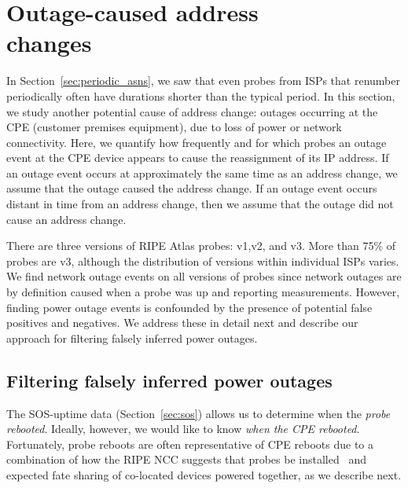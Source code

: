 
\section{Outage-caused address \\ changes}
\label{sec:outages}

In Section~\ref{sec:periodic_asns}, we saw that even probes from ISPs
that renumber periodically
often have durations shorter than the typical period. In this section,
we study another potential cause of address change: outages occurring
at the CPE (customer premises equipment), due to loss of power or network connectivity. Here, we quantify how frequently and for which probes an
outage event at the CPE device appears to
cause the reassignment of its IP address. If an outage event occurs
at approximately the same time as an address change, we assume that the
outage caused the address change. If an outage event occurs
distant in time from an address change, then we assume that the outage
did not cause an address change. 

There are three versions of RIPE Atlas probes: v1,v2, and v3. More
than 75\% of probes are v3, although the distribution of versions within
individual ISPs varies. We find network outage events
on all versions of probes since network outages are by definition caused when a
probe was up and reporting measurements.
However, finding power outage
events is confounded by the presence of potential false positives and
negatives. We address these in detail next and describe our approach
for filtering falsely inferred power outages.

\subsection{Filtering falsely inferred power outages}

The SOS-uptime data (Section~\ref{sec:sos}) allows us to
determine when the \emph{probe rebooted}. Ideally, however, we would like to know
\emph{when the CPE rebooted}.  Fortunately, probe
reboots are often representative of CPE reboots due to a
combination of how the RIPE NCC suggests that probes be
installed~\cite{cpepowersprobe} and expected fate sharing of co-located
devices powered together, as we describe next.  

